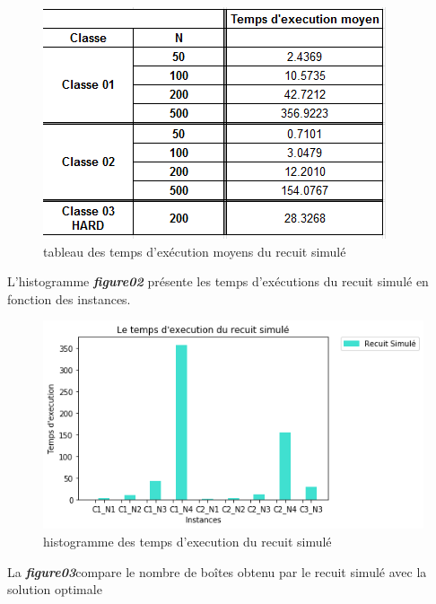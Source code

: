 \documentclass[12pt]{article}
\begin{document}
\begin{figure}[H]
    \centering
    \includegraphics[]{../figures/RS/rs tab temps.PNG}
    \caption{tableau des temps d'exécution moyens du recuit simulé}
\end{figure}
L’histogramme \textbf{\emph{figure02}} présente les temps d’exécutions  du recuit simulé en fonction des instances.
\begin{figure}[H]
    \centering
    \includegraphics[width=\linewidth]{../figures/RS/texec rs(1).png}
    \caption{histogramme des temps d'execution du recuit simulé}
\end{figure}
La  \textbf{\emph{figure03}}compare le nombre de boîtes obtenu par le recuit simulé avec la solution optimale
\end{document}
